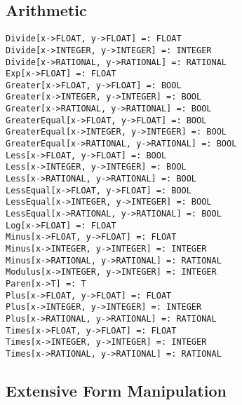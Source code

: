\subsection{Arithmetic}

\begin{verbatim}
Divide[x->FLOAT, y->FLOAT] =: FLOAT
Divide[x->INTEGER, y->INTEGER] =: INTEGER
Divide[x->RATIONAL, y->RATIONAL] =: RATIONAL
Exp[x->FLOAT] =: FLOAT
Greater[x->FLOAT, y->FLOAT] =: BOOL
Greater[x->INTEGER, y->INTEGER] =: BOOL
Greater[x->RATIONAL, y->RATIONAL] =: BOOL
GreaterEqual[x->FLOAT, y->FLOAT] =: BOOL
GreaterEqual[x->INTEGER, y->INTEGER] =: BOOL
GreaterEqual[x->RATIONAL, y->RATIONAL] =: BOOL
Less[x->FLOAT, y->FLOAT] =: BOOL
Less[x->INTEGER, y->INTEGER] =: BOOL
Less[x->RATIONAL, y->RATIONAL] =: BOOL
LessEqual[x->FLOAT, y->FLOAT] =: BOOL
LessEqual[x->INTEGER, y->INTEGER] =: BOOL
LessEqual[x->RATIONAL, y->RATIONAL] =: BOOL
Log[x->FLOAT] =: FLOAT
Minus[x->FLOAT, y->FLOAT] =: FLOAT
Minus[x->INTEGER, y->INTEGER] =: INTEGER
Minus[x->RATIONAL, y->RATIONAL] =: RATIONAL
Modulus[x->INTEGER, y->INTEGER] =: INTEGER
Paren[x->T] =: T
Plus[x->FLOAT, y->FLOAT] =: FLOAT
Plus[x->INTEGER, y->INTEGER] =: INTEGER
Plus[x->RATIONAL, y->RATIONAL] =: RATIONAL
Times[x->FLOAT, y->FLOAT] =: FLOAT
Times[x->INTEGER, y->INTEGER] =: INTEGER
Times[x->RATIONAL, y->RATIONAL] =: RATIONAL
\end{verbatim}

\subsection{Extensive Form Manipulation}

